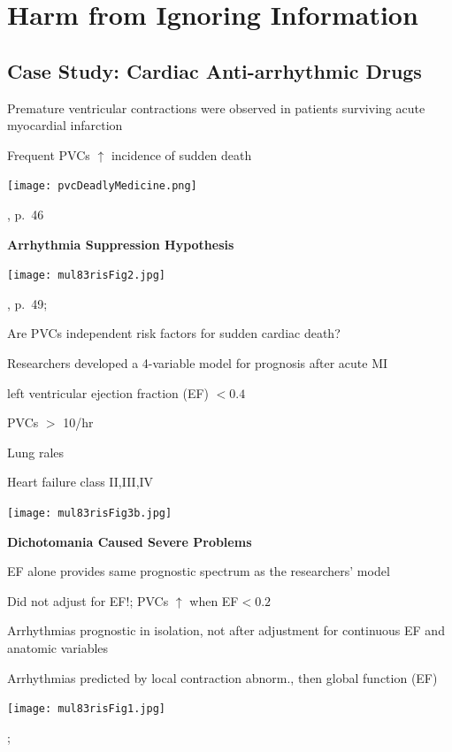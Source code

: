 \section{Harm from Ignoring Information}
\subsection{Case Study: Cardiac Anti-arrhythmic Drugs}
\bi
\item Premature ventricular contractions were observed in patients
surviving acute myocardial infarction
\item Frequent PVCs $\uparrow$ incidence of sudden death
\ei

\centerline{\texttt{[image: pvcDeadlyMedicine.png]}}
\citet{moo95dea}, p.\ 46

\textbf{Arrhythmia Suppression Hypothesis}


\centerline{\texttt{[image: mul83risFig2.jpg]}}
\citet{moo95dea}, p.~49; \cite{mul83ris}

Are PVCs independent risk factors for sudden cardiac death?

Researchers developed a 4-variable model for prognosis after acute MI
 \bi
 \item left ventricular ejection fraction (EF) $< 0.4$
 \item PVCs $>$ 10/hr
 \item Lung rales
 \item Heart failure class II,III,IV
 \ei

\centerline{\texttt{[image: mul83risFig3b.jpg]}}
\citet{mul83ris}

\textbf{Dichotomania Caused Severe Problems}
\bi
\item EF alone provides same prognostic spectrum as the researchers'
model
\item Did not adjust for EF!; PVCs $\uparrow$ when EF$<0.2$
\item Arrhythmias prognostic in isolation, not after
adjustment for continuous EF and anatomic variables
\item Arrhythmias predicted by local contraction
abnorm., then global function (EF)
\ei

\centerline{\texttt{[image: mul83risFig1.jpg]}}
\citet{mul83ris}; \citet{cal82pro}

